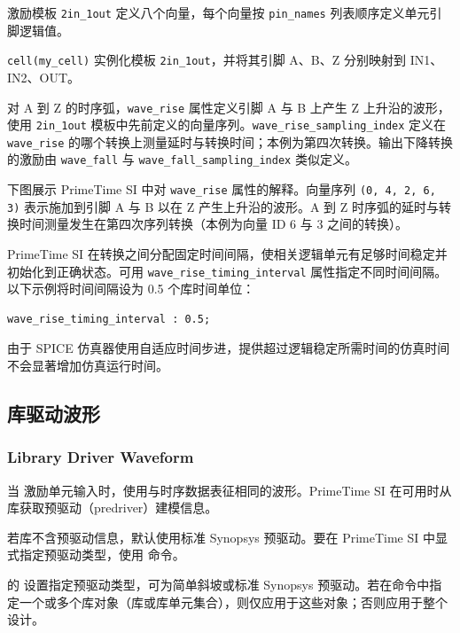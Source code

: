 激励模板 \texttt{2in\_1out} 定义八个向量，每个向量按 \texttt{pin\_names} 列表顺序定义单元引脚逻辑值。

\texttt{cell(my\_cell)} 实例化模板 \texttt{2in\_1out}，并将其引脚 A、B、Z 分别映射到 IN1、IN2、OUT。

对 A 到 Z 的时序弧，\texttt{wave\_rise} 属性定义引脚 A 与 B 上产生 Z 上升沿的波形，使用 \texttt{2in\_1out} 模板中先前定义的向量序列。\texttt{wave\_rise\_sampling\_index} 定义在 \texttt{wave\_rise} 的哪个转换上测量延时与转换时间；本例为第四次转换。输出下降转换的激励由 \texttt{wave\_fall} 与 \texttt{wave\_fall\_sampling\_index} 类似定义。

下图展示 PrimeTime SI 中对 \texttt{wave\_rise} 属性的解释。向量序列 \texttt{(0, 4, 2, 6, 3)} 表示施加到引脚 A 与 B 以在 Z 产生上升沿的波形。A 到 Z 时序弧的延时与转换时间测量发生在第四次序列转换（本例为向量 ID 6 与 3 之间的转换）。


PrimeTime SI 在转换之间分配固定时间间隔，使相关逻辑单元有足够时间稳定并初始化到正确状态。可用 \texttt{wave\_rise\_timing\_interval} 属性指定不同时间间隔。以下示例将时间间隔设为 0.5 个库时间单位：
\begin{lstlisting}
wave_rise_timing_interval : 0.5;
\end{lstlisting}

由于 SPICE 仿真器使用自适应时间步进，提供超过逻辑稳定所需时间的仿真时间不会显著增加仿真运行时间。

\subsection{库驱动波形}
\subsubsection*{Library Driver Waveform}

当  激励单元输入时，使用与时序数据表征相同的波形。PrimeTime SI 在可用时从库获取预驱动（predriver）建模信息。

若库不含预驱动信息，默认使用标准 Synopsys 预驱动。要在 PrimeTime SI 中显式指定预驱动类型，使用  命令。

 的  设置指定预驱动类型，可为简单斜坡或标准 Synopsys 预驱动。若在命令中指定一个或多个库对象（库或库单元集合），则仅应用于这些对象；否则应用于整个设计。

